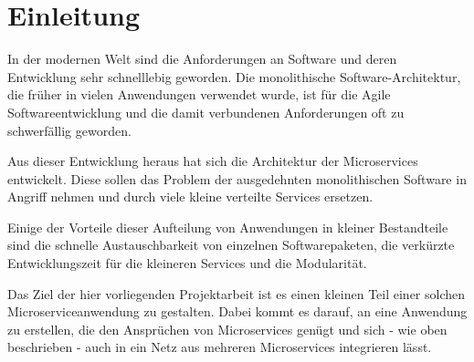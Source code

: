 
\chapter{Einleitung}
\label{ch:Einleitung}
In der modernen Welt sind die Anforderungen an Software und deren Entwicklung sehr schnelllebig geworden. Die monolithische Software-Architektur, die früher in vielen Anwendungen verwendet wurde, ist für die Agile Softwareentwicklung und die damit verbundenen Anforderungen oft zu schwerfällig geworden.

Aus dieser Entwicklung heraus hat sich die Architektur der \glqq Microservices\grqq{} entwickelt. Diese sollen das Problem der ausgedehnten monolithischen Software in Angriff nehmen und durch viele kleine  verteilte Services ersetzen.

Einige der Vorteile dieser Aufteilung von Anwendungen in kleiner Bestandteile sind die schnelle Austauschbarkeit von einzelnen Softwarepaketen, die verkürzte Entwicklungszeit für die kleineren Services und die Modularität.

Das Ziel der hier vorliegenden Projektarbeit ist es einen kleinen Teil einer solchen Microserviceanwendung zu gestalten. Dabei kommt es darauf, an eine Anwendung zu erstellen, die den Ansprüchen von Microservices genügt und sich - wie oben beschrieben - auch in ein Netz aus mehreren Microservices integrieren lässt.